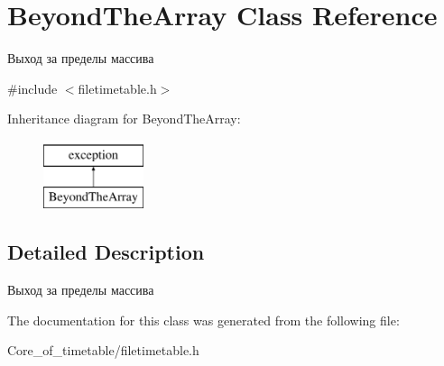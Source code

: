 \hypertarget{class_beyond_the_array}{}\section{Beyond\+The\+Array Class Reference}
\label{class_beyond_the_array}


Выход за пределы массива  




{\ttfamily \#include $<$filetimetable.\+h$>$}

Inheritance diagram for Beyond\+The\+Array\+:\begin{figure}[H]
\begin{center}
\leavevmode
\includegraphics[height=2.000000cm]{class_beyond_the_array}
\end{center}
\end{figure}


\subsection{Detailed Description}
Выход за пределы массива 

The documentation for this class was generated from the following file\+:\begin{DoxyCompactItemize}
\item 
Core\+\_\+of\+\_\+timetable/filetimetable.\+h\end{DoxyCompactItemize}
